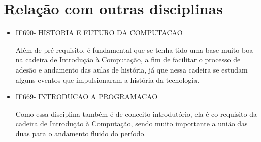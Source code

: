 \documentclass[a4paper, 12pt]{article}
\begin{document}
\section{Relação com outras disciplinas}
    \par
    \begin{itemize}
        \item IF690- HISTORIA E FUTURO DA COMPUTACAO
            \par 
            Além de pré-requisito, é fundamental que se tenha tido uma base muito boa na cadeira de Introdução à Computação, a fim de facilitar o processo de adesão e andamento das aulas de história, já que nessa cadeira se estudam alguns eventos que impulsionaram a história da tecnologia.\cite{sitecinHFC}
        \item IF669- INTRODUCAO A PROGRAMACAO
            \par
            Como essa disciplina também é de conceito introdutório, ela é co-requisito da cadeira de Introdução à Computação, sendo muito importante a união das duas para o andamento fluido do período.\cite{sitecinIP}
    \end{itemize}

\printbibliography
\end{document}
